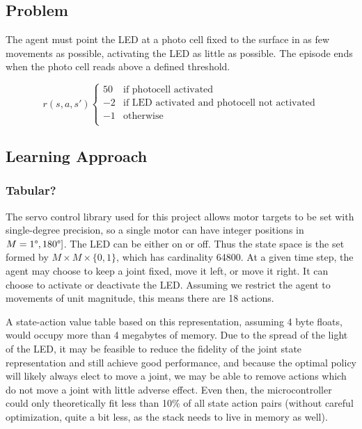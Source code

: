 \documentclass{article}
\begin{document}
	\subsection{Problem}
	
	The agent must point the LED at a photo cell fixed to the surface in as few movements as possible, activating the LED as little as possible. The episode ends when the photo cell reads above a defined threshold. 
	
	\[ r(s,a,s')  \left\{
	\begin{array}{ll}
		50 & \text{if photocell activated} \\
		-2 & \text{if LED activated and photocell not activated} \\
		-1 & \text{otherwise} \\
	\end{array} 
	\right. \]
	
	
	\subsection{Learning Approach}
	
	\subsubsection{Tabular?}
	
	The servo control library used for this project allows motor targets to be set with single-degree precision, so a single motor can have integer positions in $M = {1\degree, 180\degree]}$. The LED can be either on or off. Thus the state space is the set formed by $M \times M \times \{0,1\}$, which has cardinality 64800. At a given time step, the agent may choose to keep a joint fixed, move it left, or move it right. It can choose to activate or deactivate the LED. Assuming we restrict the agent to movements of unit magnitude, this means there are 18 actions.

	A state-action value table based on this representation, assuming 4 byte floats, would occupy more than 4 megabytes of memory. Due to the spread of the light of the LED, it may be feasible to reduce the fidelity of the joint state representation and still achieve good performance, and because the optimal policy will likely always elect to move a joint, we may be able to remove actions which do not move a joint with little adverse effect. Even then, the microcontroller could only theoretically fit less than 10\% of all state action pairs (without careful optimization, quite a bit less, as the stack needs to live in memory as well).
	
\end{document}
